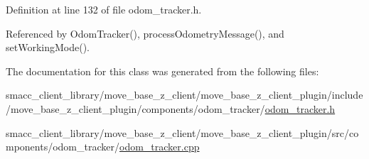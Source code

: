 Definition at line 132 of file odom\+\_\+tracker.\+h.



Referenced by Odom\+Tracker(), process\+Odometry\+Message(), and set\+Working\+Mode().



The documentation for this class was generated from the following files\+:\begin{DoxyCompactItemize}
\item 
smacc\+\_\+client\+\_\+library/move\+\_\+base\+\_\+z\+\_\+client/move\+\_\+base\+\_\+z\+\_\+client\+\_\+plugin/include/move\+\_\+base\+\_\+z\+\_\+client\+\_\+plugin/components/odom\+\_\+tracker/\hyperlink{odom__tracker_8h}{odom\+\_\+tracker.\+h}\item 
smacc\+\_\+client\+\_\+library/move\+\_\+base\+\_\+z\+\_\+client/move\+\_\+base\+\_\+z\+\_\+client\+\_\+plugin/src/components/odom\+\_\+tracker/\hyperlink{odom__tracker_8cpp}{odom\+\_\+tracker.\+cpp}\end{DoxyCompactItemize}

